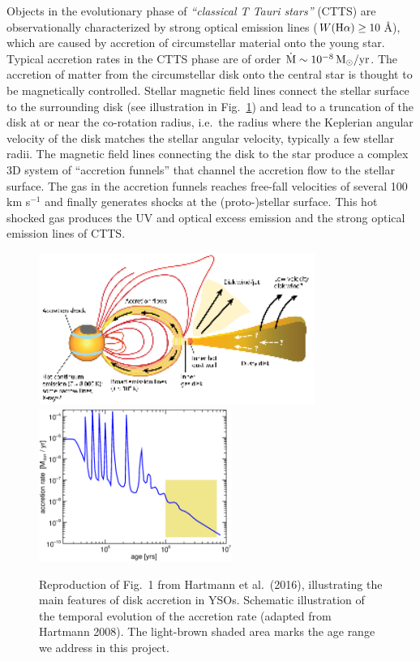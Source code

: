 \documentclass[10pt,fleqn,twoside,a4paper]{article}
\begin{document}
Objects in the evolutionary phase of {\em ``classical T Tauri stars''}
(CTTS) are observationally characterized by strong optical emission lines 
($W({\rm H}\alpha) \ge 10$\,\AA), which are caused by accretion of 
circumstellar material onto the young star.
Typical accretion rates in the CTTS phase are of order
$\dot{\rm M} \sim 10^{-8}\,\rm M_\odot/yr$.
%
The accretion of matter from the circumstellar disk onto the
central star is thought to be magnetically controlled.
Stellar
magnetic field lines connect the stellar surface to
the surrounding disk (see illustration in Fig.~\ref{hartmann.fig})
and lead to a truncation of the
disk at or near the co-rotation radius, i.e.~the radius
where the Keplerian angular velocity of the disk
matches the stellar angular velocity, typically a few stellar radii. 
The magnetic field lines connecting the disk to the star
produce a complex 3D system of ``accretion funnels''
that channel the accretion flow to the stellar surface.
The gas in the accretion funnels reaches free-fall velocities
of several 100 km s$^{-1}$ and finally generates shocks at the
(proto-)stellar surface. 
This hot shocked gas produces the UV and
optical excess emission 
and the strong optical emission lines of CTTS.


\begin{figure} %
\centering
\includegraphics[width=9.0cm]{accretion-hartmann-scetch.eps}\hspace{1mm}
\includegraphics[width=6.3cm,clip=true]{Mdot-hartmann.eps}
\caption{ Reproduction of Fig.~1 from Hartmann et al.~(2016),
illustrating the main features of disk accretion in YSOs.
 Schematic illustration of the temporal evolution of the accretion rate
(adapted from Hartmann 2008). The light-brown shaded area marks the age range
we address in this project.
\label{hartmann.fig}}
\end{figure} %
\end{document}
